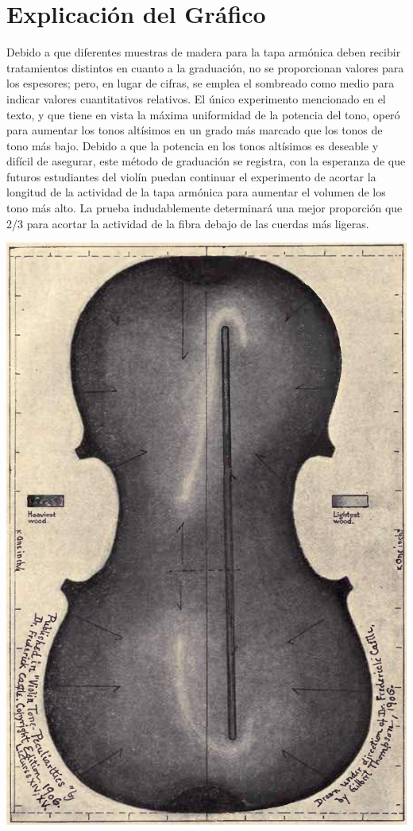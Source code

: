 \chapter*{Explicación del Gráfico}
Debido a que diferentes muestras de madera para la tapa armónica deben recibir tratamientos distintos en cuanto a la graduación, no se proporcionan valores para los espesores; pero, en lugar de cifras, se emplea el sombreado como medio para indicar valores cuantitativos relativos. El único experimento mencionado en el texto, y que tiene en vista la máxima uniformidad de la potencia del tono, operó para aumentar los tonos altísimos en un grado más marcado que los tonos de tono más bajo. Debido a que la potencia en los tonos altísimos es deseable y difícil de asegurar, este método de graduación se registra, con la esperanza de que futuros estudiantes del violín puedan continuar el experimento de acortar la longitud de la actividad de la tapa armónica para aumentar el volumen de los tono más alto. La prueba indudablemente determinará una mejor proporción que 2/3 para acortar la actividad de la fibra debajo de las cuerdas más ligeras.


\begin{center}
\includegraphics[width=1\textwidth]{../img/grafico.png} %
\end{center}
